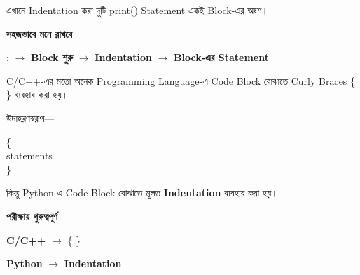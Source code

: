এখানে Indentation করা দুটি
\textenglish{\ttfamily print()}
Statement একই Block-এর অংশ।

\begin{rememberbox}

\textbf{\color{deepOrange}সহজভাবে মনে রাখবে}

\begin{center}

\textenglish{\ttfamily :}
\(\longrightarrow\)
\textbf{Block শুরু}
\(\longrightarrow\)
\textbf{Indentation}
\(\longrightarrow\)
\textbf{Block-এর Statement}

\end{center}

\end{rememberbox}



C/C++-এর মতো অনেক Programming Language-এ Code Block
বোঝাতে Curly Braces
\textenglish{\ttfamily \{ \}}
ব্যবহার করা হয়।

উদাহরণস্বরূপ—

\begin{codebox}

\begin{english}
\ttfamily
\{\\
\hspace*{4mm}statements\\
\}
\end{english}

\end{codebox}

কিন্তু Python-এ Code Block বোঝাতে মূলত
\textbf{Indentation} ব্যবহার করা হয়।

\begin{rememberbox}

\textbf{\color{deepOrange}পরীক্ষায় গুরুত্বপূর্ণ}

\begin{center}

\textbf{C/C++}
\(\longrightarrow\)
\textenglish{\ttfamily \{ \}}

\qquad

\textbf{Python}
\(\longrightarrow\)
\textbf{Indentation}

\end{center}

\end{rememberbox}

